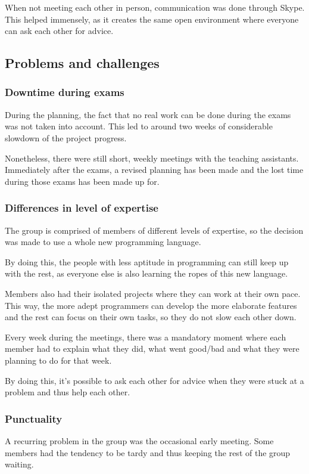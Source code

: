 \documentclass[10pt,a4paper]{report}
\begin{document}
			When not meeting each other in person, communication was done through Skype. This helped immensely, as it creates the same open environment where everyone can ask each other for advice.

		\subsection{Problems and challenges}
			\subsubsection*{Downtime during exams}
				During the planning, the fact that no real work can be done during the exams was not taken into account. This led to around two weeks of considerable slowdown of the project progress.
				
				Nonetheless, there were still short, weekly meetings with the teaching assistants. Immediately after the exams, a revised planning has been made and the lost time during those exams has been made up for.
			\subsubsection*{Differences in level of expertise}
				The group is comprised of members of different levels of expertise, so the decision was made to use a whole new programming language.
				
				By doing this, the people with less aptitude in programming can still keep up with the rest, as everyone else is also learning the ropes of this new language.
				
				Members also had their isolated projects where they can work at their own pace. This way, the more adept programmers can develop the more elaborate features and the rest can focus on their own tasks, so they do not slow each other down.
				
				Every week during the meetings, there was a mandatory moment where each member had to explain what they did, what went good/bad and what they were planning to do for that week.
				
				By doing this, it's possible to ask each other for advice when they were stuck at a problem and thus help each other.
			\subsubsection*{Punctuality}
				A recurring problem in the group was the occasional early meeting. Some members had the tendency to be tardy and thus keeping the rest of the group waiting.
				
\end{document}
